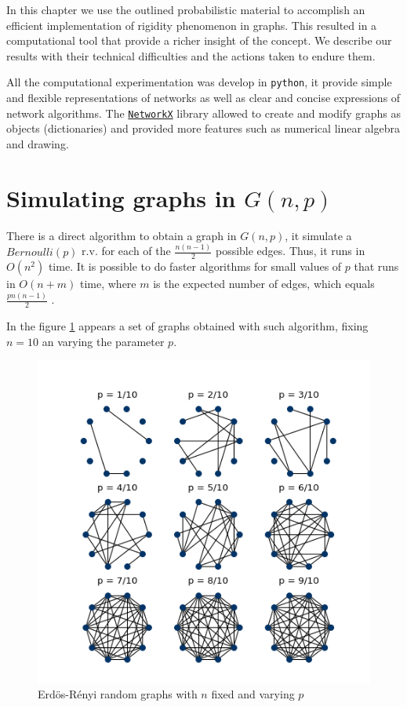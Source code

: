 In this chapter we use the outlined probabilistic material to accomplish an efficient implementation of rigidity phenomenon in graphs. This resulted in a computational tool that provide a richer insight of the concept. We describe our results with their technical difficulties and the actions taken to endure them.

All the computational experimentation was develop in \texttt{python}, it provide simple and flexible representations of networks as well as clear and concise expressions of network algorithms. The \texttt{\href{https://networkx.github.io/}{NetworkX}} library allowed to create and modify graphs as objects (dictionaries) and provided more features such as numerical linear algebra and drawing.

\section{Simulating graphs in $G(n,p)$}

There is a direct algorithm to obtain a graph in $G(n,p)$, it simulate a $Bernoulli(p)$ r.v. for each of the $\frac{n(n-1)}{2}$ possible edges. Thus, it runs in $O(n^2)$ time. It is possible to do faster algorithms for small values of $p$ that runs in $O(n + m)$ time, where $m$ is the expected number of edges, which equals $\frac{pn(n - 1)}{2}$ \cite{fastER}.

In the figure \ref{fig:ErdosRenyi10} appears a set of graphs obtained with such algorithm, fixing $n=10$ an varying the parameter $p$.

\begin{figure}[h!]
	\centering
	\includegraphics[scale=0.85]{Figures/ER-10.png}
	\caption{Erdös-Rényi random graphs with $n$ fixed and varying $p$}
	\label{fig:ErdosRenyi10}
\end{figure}

